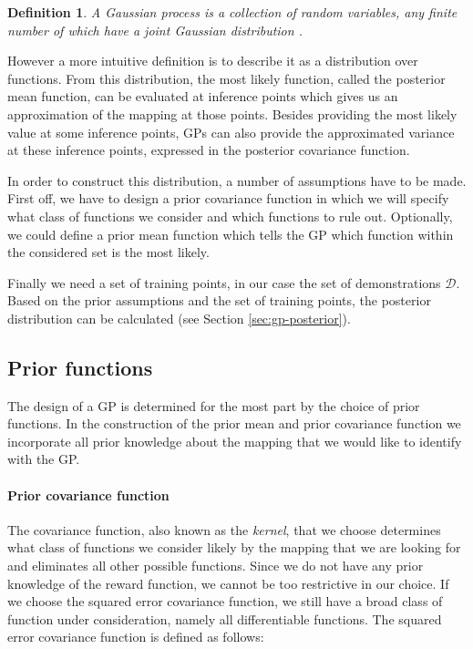 \documentclass[mscThesis.tex]{subfiles}
\begin{document}
\newtheorem{mydef}{Definition}
\begin{mydef}
A Gaussian process is a collection of random variables, any finite number of which have a joint Gaussian distribution \cite{rasmussen2006book}. 
\end{mydef}

However a more intuitive definition is to describe it as a distribution over functions. From this distribution, the most likely function, called the posterior mean function, can be evaluated at inference points which gives us an approximation of the mapping at those points. Besides providing the most likely value at some inference points, GPs can also provide the approximated variance at these inference points, expressed in the posterior covariance function.

In order to construct this distribution, a number of assumptions have to be made. First off, we have to design a prior covariance function in which we will specify what class of functions we consider and which functions to rule out. Optionally, we could define a prior mean function which tells the GP which function within the considered set is the most likely.

Finally we need a set of training points, in our case the set of demonstrations $\mathcal{D}$. Based on the prior assumptions and the set of training points, the posterior distribution can be calculated (see Section \ref{sec:gp-posterior}).


\subsection{Prior functions}

The design of a GP is determined for the most part by the choice of prior functions. In the construction of the prior mean and prior covariance function we incorporate all prior knowledge about the mapping that we would like to identify with the GP. 

\paragraph{Prior covariance function}
The covariance function, also known as the \emph{kernel}, that we choose determines what class of functions we consider likely by the mapping that we are looking for and eliminates all other possible functions. Since we do not have any prior knowledge of the reward function, we cannot be too restrictive in our choice. If we choose the squared error covariance function, we still have a broad class of function under consideration, namely all differentiable functions. The squared error covariance function is defined as follows:
\end{document}
